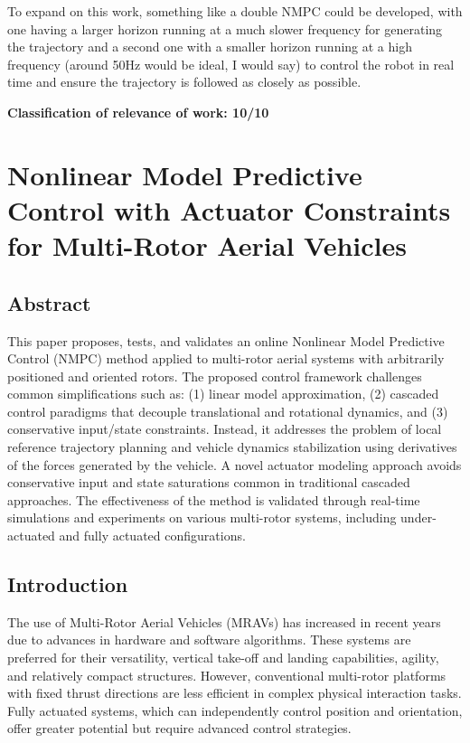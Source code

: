 \documentclass[a4paper,12pt]{article}
\begin{document}
    To expand on this work, something like a double NMPC could be developed, with one having a larger horizon running at a much slower frequency for generating the trajectory and a second one with a smaller horizon running at a high frequency (around 50Hz would be ideal, I would say) to control the robot in real time and ensure the trajectory is followed as closely as possible.

    \textbf{Classification of relevance of work: 10/10}

\clearpage

\section{Nonlinear Model Predictive Control with Actuator Constraints for Multi-Rotor Aerial Vehicles}

    \subsection{Abstract}
    This paper proposes, tests, and validates an online Nonlinear Model Predictive Control (NMPC) method applied to multi-rotor aerial systems with arbitrarily positioned and oriented rotors. The proposed control framework challenges common simplifications such as: (1) linear model approximation, (2) cascaded control paradigms that decouple translational and rotational dynamics, and (3) conservative input/state constraints. Instead, it addresses the problem of local reference trajectory planning and vehicle dynamics stabilization using derivatives of the forces generated by the vehicle. A novel actuator modeling approach avoids conservative input and state saturations common in traditional cascaded approaches. The effectiveness of the method is validated through real-time simulations and experiments on various multi-rotor systems, including under-actuated and fully actuated configurations.

    \subsection{Introduction}
    The use of Multi-Rotor Aerial Vehicles (MRAVs) has increased in recent years due to advances in hardware and software algorithms. These systems are preferred for their versatility, vertical take-off and landing capabilities, agility, and relatively compact structures. However, conventional multi-rotor platforms with fixed thrust directions are less efficient in complex physical interaction tasks. Fully actuated systems, which can independently control position and orientation, offer greater potential but require advanced control strategies.
\end{document}
